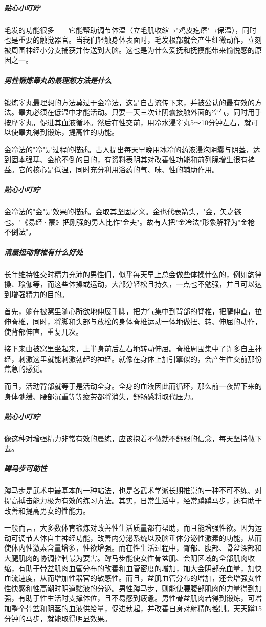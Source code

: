 \subparagraph{贴心小叮咛}

毛发的功能很多——它能帮助调节体温（立毛肌收缩→"鸡皮疙瘩"→保温），同时也是重要的触觉器官。当我们轻触身体表面时，毛发根部就会产生细微动作，立刻被周围神经小分支捕获并传送到大脑。这也是为什么爱抚和抚摸能带来愉悦感的原因之一。

\subparagraph{男性锻炼睾丸的最理想方法是什么}

锻炼睾丸最理想的方法莫过于金冷法，这是自古流传下来，并被公认的最有效的方法。睾丸必须在低温中才能活动。只要一天三次让阴囊接触外面的空气，同时用手按摩睾丸，促进其血液循环。然后在性交前，用冷水浸睾丸5～10分钟左右，就可以使睾丸得到锻炼，提高性的功能。

金冷法的"冷"是过程的描述。古人提出每天早晚用冰冷的药液浸泡阴囊与阴茎，达到固本强基、金枪不倒的目的，有资料表明其对改善性功能和前列腺增生很有裨益。它的核心是低温，同时充分利用浴药的气、味、性的辅助作用。

\subparagraph{贴心小叮咛}

金冷法的"金"是效果的描述。金取其坚固之义。金也代表箭头，"金，矢之镞也。"《易经·蒙》把刚强的男人比作"金夫"。故有人把"金冷法"形象解释为"金枪不倒法"。

\subparagraph{清晨扭动脊椎有什么好处}

长年维持性交时精力充沛的男性们，似乎每天早上总会做些体操什么的，例如韵律操、瑜伽等，而这些体操或运动，大部分轻松且持久，一点也不勉强，并且可以达到增强精力的目的。

首先，躺在被窝里随心所欲地伸展手脚，把力气集中到背部的脊椎，把腿伸直，拉伸脊椎，同时，将脚和头部与放松的身体脊椎运动一体地做扭、转、伸屈的动作，使背部伸直，重复几次。

接下来由被窝里坐起来，上半身前后左右地转动伸屈。脊椎周围集中了许多自主神经，刺激这里就能刺激勃起的神经。就像在身体上加引擎似的，会产生性交前那份焦急的感觉。

而且，活动背部就等于是活动全身。全身的血液因此而循环，那么前一夜留下来的身体弛缓、腰部沉重等等疲劳都将消失，舒畅感将取代压力。

\subparagraph{贴心小叮咛}

像这种对增强精力非常有效的晨练，应该抱着不做就不舒服的信念，每天坚持做下去。

\subparagraph{蹲马步可助性}

蹲马步是武术中最基本的一种站法，也是各武术学派长期推崇的一种不可不练、对提高搏击能力极为有效的练习方法。其实，日常生活中，经常蹲蹲马步，还有助于改善和提高男女的性能力。

一般而言，大多数体育锻炼对改善性生活质量都有帮助，而且能增强性欲。因为运动可调节人体自主神经功能，改善内分泌系统以及脑垂体分泌性激素的功能，从而使体内性激素含量增多，性欲增强。而在性生活过程中，臀部、腹部、骨盆深部和大腿肌肉的协调控制最为要害。蹲马步能使女性骨盆肌、会阴区域的全部肌肉收缩，有助于骨盆肌肉血管分布的改善和血管密度的增加，加大会阴部充血量，加快血流速度，从而增加性器官的敏感性。而且，盆肌血管分布的增加，还会增强女性性快感和性高潮时阴道黏液的分泌。男性蹲马步，则能使腰腹部肌肉的力量得到加强，有助于性生活时支撑体位，且不易感到疲惫。男性骨盆肌肉若得到锻炼，可增加整个骨盆和阴茎的血液供给量，促进勃起，并改善自身对射精的控制。天天蹲15分钟的马步，就能取得明显效果。

